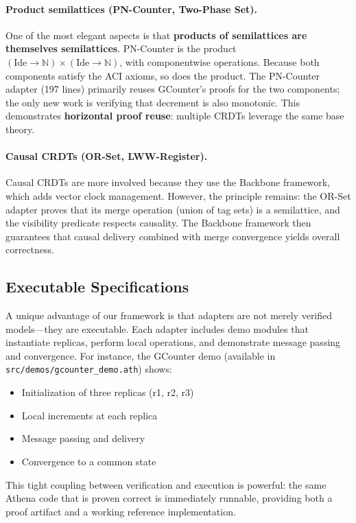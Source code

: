 \paragraph{Product semilattices (PN-Counter, Two-Phase Set).}
One of the most elegant aspects is that \textbf{products of semilattices are themselves semilattices}. PN-Counter is the product $(\text{Ide} \to \mathbb{N}) \times (\text{Ide} \to \mathbb{N})$, with componentwise operations. Because both components satisfy the ACI axioms, so does the product. The PN-Counter adapter (197 lines) primarily reuses GCounter's proofs for the two components; the only new work is verifying that decrement is also monotonic. This demonstrates \textbf{horizontal proof reuse}: multiple CRDTs leverage the same base theory.

\paragraph{Causal CRDTs (OR-Set, LWW-Register).}
Causal CRDTs are more involved because they use the Backbone framework, which adds vector clock management. However, the principle remains: the OR-Set adapter proves that its merge operation (union of tag sets) is a semilattice, and the visibility predicate respects causality. The Backbone framework then guarantees that causal delivery combined with merge convergence yields overall correctness.

\subsection{Executable Specifications}

A unique advantage of our framework is that adapters are not merely verified models—they are executable. Each adapter includes demo modules that instantiate replicas, perform local operations, and demonstrate message passing and convergence. For instance, the GCounter demo (available in \texttt{src/demos/gcounter\_demo.ath}) shows:
\begin{itemize}
  \item Initialization of three replicas (r1, r2, r3)
  \item Local increments at each replica
  \item Message passing and delivery
  \item Convergence to a common state
\end{itemize}

This tight coupling between verification and execution is powerful: the same Athena code that is proven correct is immediately runnable, providing both a proof artifact and a working reference implementation.

